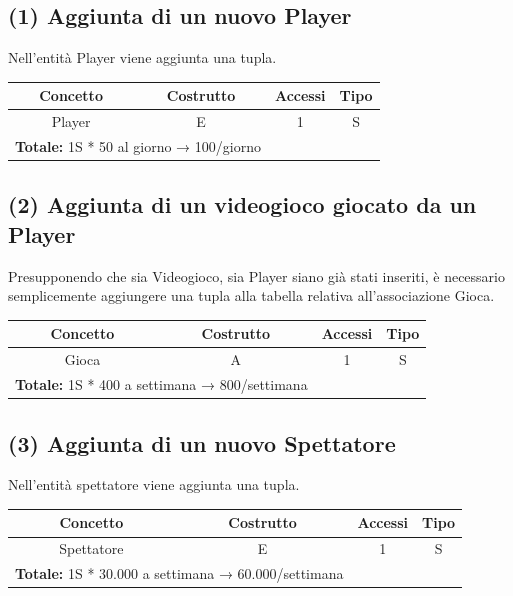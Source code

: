 \documentclass[a4paper,12pt]{report}
\begin{document}
\subsection*{(1) Aggiunta di un nuovo Player}
Nell'entità Player viene aggiunta una tupla.
\begin{center}
	\begin{tabular}{|c|c|c|c|}
		\hline\rowcolor{pink}
		Concetto & Costrutto & Accessi & Tipo\\
		\hline\hline
		Player & E & 1 & S\\
		\hline\hline
		\multicolumn{2}{l}{
			\textbf{Totale:} 1S * 50 al giorno → 100/giorno} \\
		\hline
	\end{tabular}
\end{center}
\subsection*{(2) Aggiunta di un videogioco giocato da un Player}
Presupponendo che sia Videogioco, sia Player siano già stati inseriti, è necessario semplicemente aggiungere una tupla alla tabella relativa all'associazione Gioca.
\begin{center}
	\begin{tabular}{|c|c|c|c|}
		\hline\rowcolor{pink}
		Concetto & Costrutto & Accessi & Tipo\\
		\hline\hline
		Gioca & A & 1 & S\\
		\hline\hline
		\multicolumn{2}{l}{%
			\textbf{Totale:} 1S * 400 a settimana → 800/settimana} \\
		\hline
	\end{tabular}
\end{center}
\subsection*{(3) Aggiunta di un nuovo Spettatore}
Nell'entità spettatore viene aggiunta una tupla.
\begin{center}
	\begin{tabular}{|c|c|c|c|}
		\hline\rowcolor{pink}
		Concetto & Costrutto & Accessi & Tipo\\
		\hline\hline
		Spettatore & E & 1 & S\\
		\hline\hline
		\multicolumn{2}{l}{%
			\textbf{Totale:}  1S * 30.000 a settimana → 60.000/settimana } \\
		\hline
	\end{tabular}
\end{center}
\end{document}

